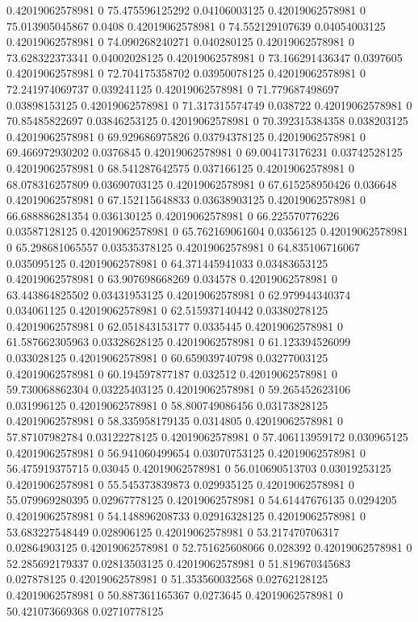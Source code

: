 0.42019062578981 0 75.475596125292 0.04106003125
0.42019062578981 0 75.013905045867 0.0408
0.42019062578981 0 74.552129107639 0.04054003125
0.42019062578981 0 74.090268240271 0.040280125
0.42019062578981 0 73.628322373341 0.04002028125
0.42019062578981 0 73.166291436347 0.0397605
0.42019062578981 0 72.704175358702 0.03950078125
0.42019062578981 0 72.241974069737 0.039241125
0.42019062578981 0 71.779687498697 0.03898153125
0.42019062578981 0 71.317315574749 0.038722
0.42019062578981 0 70.85485822697 0.03846253125
0.42019062578981 0 70.392315384358 0.038203125
0.42019062578981 0 69.929686975826 0.03794378125
0.42019062578981 0 69.466972930202 0.0376845
0.42019062578981 0 69.004173176231 0.03742528125
0.42019062578981 0 68.541287642575 0.037166125
0.42019062578981 0 68.078316257809 0.03690703125
0.42019062578981 0 67.615258950426 0.036648
0.42019062578981 0 67.152115648833 0.03638903125
0.42019062578981 0 66.688886281354 0.036130125
0.42019062578981 0 66.225570776226 0.03587128125
0.42019062578981 0 65.762169061604 0.0356125
0.42019062578981 0 65.298681065557 0.03535378125
0.42019062578981 0 64.835106716067 0.035095125
0.42019062578981 0 64.371445941033 0.03483653125
0.42019062578981 0 63.907698668269 0.034578
0.42019062578981 0 63.443864825502 0.03431953125
0.42019062578981 0 62.979944340374 0.034061125
0.42019062578981 0 62.515937140442 0.03380278125
0.42019062578981 0 62.051843153177 0.0335445
0.42019062578981 0 61.587662305963 0.03328628125
0.42019062578981 0 61.123394526099 0.033028125
0.42019062578981 0 60.659039740798 0.03277003125
0.42019062578981 0 60.194597877187 0.032512
0.42019062578981 0 59.730068862304 0.03225403125
0.42019062578981 0 59.265452623106 0.031996125
0.42019062578981 0 58.800749086456 0.03173828125
0.42019062578981 0 58.335958179135 0.0314805
0.42019062578981 0 57.87107982784 0.03122278125
0.42019062578981 0 57.406113959172 0.030965125
0.42019062578981 0 56.941060499654 0.03070753125
0.42019062578981 0 56.475919375715 0.03045
0.42019062578981 0 56.010690513703 0.03019253125
0.42019062578981 0 55.545373839873 0.029935125
0.42019062578981 0 55.079969280395 0.02967778125
0.42019062578981 0 54.61447676135 0.0294205
0.42019062578981 0 54.148896208733 0.02916328125
0.42019062578981 0 53.683227548449 0.028906125
0.42019062578981 0 53.217470706317 0.02864903125
0.42019062578981 0 52.751625608066 0.028392
0.42019062578981 0 52.285692179337 0.02813503125
0.42019062578981 0 51.819670345683 0.027878125
0.42019062578981 0 51.353560032568 0.02762128125
0.42019062578981 0 50.887361165367 0.0273645
0.42019062578981 0 50.421073669368 0.02710778125
